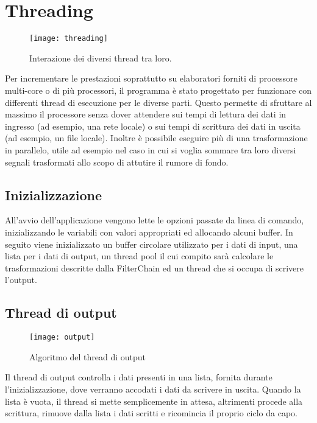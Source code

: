 \section{Threading}
\begin{figure}[htb]
	\begin{center}
		\texttt{[image: threading]}
	\end{center}
	\caption{Interazione dei diversi thread tra loro.}
	\label{fig:threading}
\end{figure}
Per incrementare le prestazioni soprattutto su elaboratori forniti di processore
multi-core o di pi\`u processori, il programma \`e stato progettato per
funzionare con differenti thread di esecuzione per le diverse parti. Questo
permette di sfruttare al massimo il processore senza dover attendere sui tempi
di lettura dei dati in ingresso (ad esempio, una rete locale) o sui tempi di
scrittura dei dati in uscita (ad esempio, un file locale). Inoltre \`e possibile
eseguire pi\`u di una trasformazione in parallelo, utile ad esempio nel caso in
cui si voglia sommare tra loro diversi segnali trasformati allo scopo di
attutire il rumore di fondo.

\subsection{Inizializzazione}
All'avvio dell'applicazione vengono lette le opzioni passate da linea di
comando, inizializzando le variabili con valori appropriati ed allocando alcuni
buffer. In seguito viene inizializzato un buffer circolare utilizzato per i
dati di input, una lista per i dati di output, un thread pool il cui compito
sar\`a calcolare le trasformazioni descritte dalla FilterChain ed un thread che
si occupa di scrivere l'output.

\subsection{Thread di output}
\label{threadout}
\begin{figure}[htb]
	\begin{center}
		\texttt{[image: output]}
	\end{center}
	\caption{Algoritmo del thread di output}
	\label{fig:output}
\end{figure}
Il thread di output controlla i dati presenti in una lista, fornita durante
l'inizializzazione, dove verranno accodati i dati da scrivere in uscita. Quando
la lista \`e vuota, il thread si mette semplicemente in attesa, altrimenti
procede alla scrittura, rimuove dalla lista i dati scritti e ricomincia il
proprio ciclo da capo.

